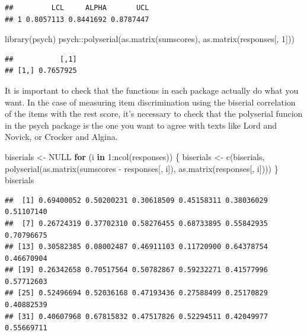 \documentclass[
]{book}
\newenvironment{Shaded}{\begin{snugshade}}{\end{snugshade}}
\newcommand{\ConstantTok}[1]{\textcolor[rgb]{0.00,0.00,0.00}{#1}}
\newcommand{\ControlFlowTok}[1]{\textcolor[rgb]{0.13,0.29,0.53}{\textbf{#1}}}
\newcommand{\DecValTok}[1]{\textcolor[rgb]{0.00,0.00,0.81}{#1}}
\newcommand{\FunctionTok}[1]{\textcolor[rgb]{0.00,0.00,0.00}{#1}}
\newcommand{\NormalTok}[1]{#1}
\newcommand{\OtherTok}[1]{\textcolor[rgb]{0.56,0.35,0.01}{#1}}
\newcommand{\SpecialCharTok}[1]{\textcolor[rgb]{0.00,0.00,0.00}{#1}}
\begin{document}
\begin{verbatim}
##         LCL     ALPHA       UCL
## 1 0.8057113 0.8441692 0.8787447
\end{verbatim}

\begin{Shaded}
\begin{Highlighting}[]
\FunctionTok{library}\NormalTok{(psych)}
\NormalTok{psych}\SpecialCharTok{::}\FunctionTok{polyserial}\NormalTok{(}\FunctionTok{as.matrix}\NormalTok{(sumscores), }\FunctionTok{as.matrix}\NormalTok{(responses[, }\DecValTok{1}\NormalTok{]))}
\end{Highlighting}
\end{Shaded}

\begin{verbatim}
##           [,1]
## [1,] 0.7657925
\end{verbatim}

It is important to check that the functions in each package actually do what you want. In the case of measuring item discrimination using the biserial correlation of the items with the rest score, it's necessary to check that the polyserial funcion in the psych package is the one you want to agree with texts like Lord and Novick, or Crocker and Algina.

\begin{Shaded}
\begin{Highlighting}[]
\NormalTok{biserials }\OtherTok{\textless{}{-}} \ConstantTok{NULL}
\ControlFlowTok{for}\NormalTok{ (i }\ControlFlowTok{in} \DecValTok{1}\SpecialCharTok{:}\FunctionTok{ncol}\NormalTok{(responses)) \{}
\NormalTok{  biserials }\OtherTok{\textless{}{-}} \FunctionTok{c}\NormalTok{(biserials, }\FunctionTok{polyserial}\NormalTok{(}\FunctionTok{as.matrix}\NormalTok{(sumscores }\SpecialCharTok{{-}}\NormalTok{ responses[, i]), }\FunctionTok{as.matrix}\NormalTok{(responses[, i])))}
\NormalTok{\}}
\NormalTok{biserials}
\end{Highlighting}
\end{Shaded}

\begin{verbatim}
##  [1] 0.69400052 0.50200231 0.30618509 0.45158311 0.38036029 0.51107140
##  [7] 0.26724319 0.37702310 0.58276455 0.68733895 0.55842935 0.70796675
## [13] 0.30582385 0.08002487 0.46911103 0.11720900 0.64378754 0.46670904
## [19] 0.26342658 0.70517564 0.50782867 0.59232271 0.41577996 0.57712603
## [25] 0.52496694 0.52036168 0.47193436 0.27588499 0.25170829 0.40882539
## [31] 0.40607968 0.67815832 0.47517826 0.52294511 0.42049977 0.55669711
\end{verbatim}
\end{document}
